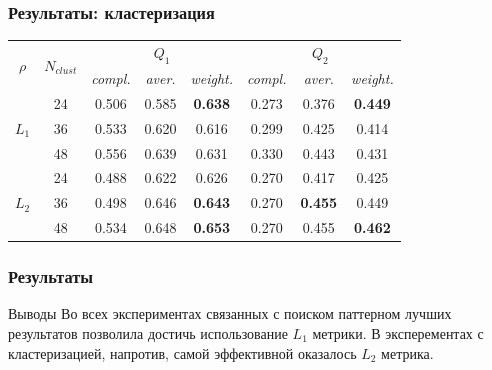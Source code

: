 \documentclass{beamer}
\begin{document}

\begin{frame}
    \frametitle{Результаты: кластеризация}   
    \begin{table}[h]
        \centering
        \begin{tabular}{c|c *{2}{|*{3}{c}}}
            \toprule
             &  &  &  \\
            \cmidrule(r){3-8}
            && \textit{compl.} & \textit{aver.} & \textit{weight.} & \textit{compl.} & \textit{aver.} & \textit{weight.} \\
            \midrule
                & 24    &   0.506  &   0.585 &    \textbf{0.638}  & 0.273   &  0.376    &   \textbf{0.449}  \\
                & 36    &   0.533  &   0.620 &    0.616  & 0.299   &  0.425    &   0.414  \\
                & 48    &   0.556  &   0.639 &    0.631  & 0.330   &  0.443    &   0.431  \\
        \midrule
                & 24    &   0.488  &   0.622 &    0.626  & 0.270   &  0.417    &   0.425  \\
                & 36    &   0.498  &   0.646 &    \textbf{0.643}  & 0.270   &  \textbf{0.455}    &   0.449  \\
                & 48    &   0.534  &   0.648 &    \textbf{0.653}  & 0.270   &  0.455    &   \textbf{0.462}  \\
        \bottomrule
        \end{tabular}
    \end{table}

\end{frame}


\begin{frame}
    \frametitle{Результаты}
    \begin{block}{Выводы}
        Во всех экспериментах связанных с поиском паттерном лучших результатов
        позволила достичь использование $L_1$ метрики. 
        В эксперементах с кластеризацией, напротив, самой эффективной оказалось 
        $L_2$ метрика.
    \end{block}
\end{frame}


\end{document}
